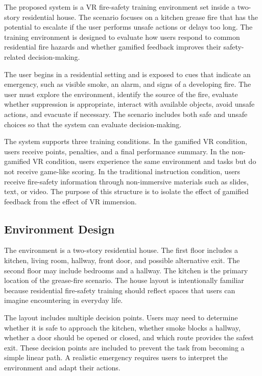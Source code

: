 \documentclass[manuscript, review]{acmart}
\begin{document}
{The proposed system is a VR fire-safety training environment set inside a two-story residential house. The scenario focuses on a kitchen grease fire that has the potential to escalate if the user performs unsafe actions or delays too long. The training environment is designed to evaluate how users respond to common residential fire hazards and whether gamified feedback improves their safety-related decision-making.

The user begins in a residential setting and is exposed to cues that indicate an emergency, such as visible smoke, an alarm, and signs of a developing fire. The user must explore the environment, identify the source of the fire, evaluate whether suppression is appropriate, interact with available objects, avoid unsafe actions, and evacuate if necessary. The scenario includes both safe and unsafe choices so that the system can evaluate decision-making.

The system supports three training conditions. In the gamified VR condition, users receive points, penalties, and a final performance summary. In the non-gamified VR condition, users experience the same environment and tasks but do not receive game-like scoring. In the traditional instruction condition, users receive fire-safety information through non-immersive materials such as slides, text, or video. The purpose of this structure is to isolate the effect of gamified feedback from the effect of VR immersion.

\subsection{Environment Design}

The environment is a two-story residential house. The first floor includes a kitchen, living room, hallway, front door, and possible alternative exit. The second floor may include bedrooms and a hallway. The kitchen is the primary location of the grease-fire scenario. The house layout is intentionally familiar because residential fire-safety training should reflect spaces that users can imagine encountering in everyday life.

The layout includes multiple decision points. Users may need to determine whether it is safe to approach the kitchen, whether smoke blocks a hallway, whether a door should be opened or closed, and which route provides the safest exit. These decision points are included to prevent the task from becoming a simple linear path. A realistic emergency requires users to interpret the environment and adapt their actions.

}
\end{document}
